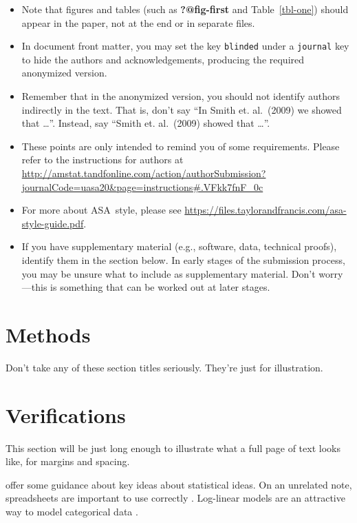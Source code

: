 \documentclass[
  12pt]{article}
\providecommand{\tightlist}{%
  \setlength{\itemsep}{0pt}\setlength{\parskip}{0pt}}\usepackage{longtable,booktabs,array}
\begin{document}
\begin{itemize}
\tightlist
\item
  Note that figures and tables (such as \textbf{?@fig-first} and
  Table~\ref{tbl-one}) should appear in the paper, not at the end or in
  separate files.
\item
  In document front matter, you may set the key \texttt{blinded} under a
  \texttt{journal} key to hide the authors and acknowledgements,
  producing the required anonymized version.
\item
  Remember that in the anonymized version, you should not identify
  authors indirectly in the text. That is, don't say ``In Smith et.
  al.~(2009) we showed that \ldots{}''. Instead, say ``Smith et.
  al.~(2009) showed that \ldots{}''.
\item
  These points are only intended to remind you of some requirements.
  Please refer to the instructions for authors at
  \url{http://amstat.tandfonline.com/action/authorSubmission?journalCode=uasa20&page=instructions\#.VFkk7fnF_0c}
\item
  For more about ASA~style, please see
  \url{https://files.taylorandfrancis.com/asa-style-guide.pdf}.
\item
  If you have supplementary material (e.g., software, data, technical
  proofs), identify them in the section below. In early stages of the
  submission process, you may be unsure what to include as supplementary
  material. Don't worry---this is something that can be worked out at
  later stages.
\end{itemize}

\section{Methods}\label{sec-meth}

Don't take any of these section titles seriously. They're just for
illustration.

\section{Verifications}\label{sec-verify}

This section will be just long enough to illustrate what a full page of
text looks like, for margins and spacing.

\addtolength{\textheight}{.5in}%

\citet{gelm:veht:2021} offer some guidance about key ideas about
statistical ideas. On an unrelated note, spreadsheets are important to
use correctly \citep{brom:woo:2018}. Log-linear models are an attractive
way to model categorical data \citep{bish:fien:1975}.
\end{document}
